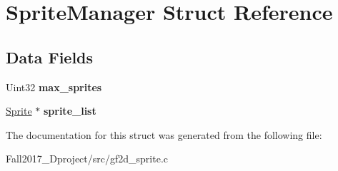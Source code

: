 \hypertarget{struct_sprite_manager}{}\section{Sprite\+Manager Struct Reference}
\label{struct_sprite_manager}
\subsection*{Data Fields}
\begin{DoxyCompactItemize}
\item 
\mbox{\label{struct_sprite_manager_a5ea83f217d51ae6c72599a9e46e1d947}} 
Uint32 {\bfseries max\+\_\+sprites}
\item 
\mbox{\label{struct_sprite_manager_a73dfacf51622ca4310f07375e16591e1}} 
\hyperlink{struct_sprite___s}{Sprite} $\ast$ {\bfseries sprite\+\_\+list}
\end{DoxyCompactItemize}


The documentation for this struct was generated from the following file\+:\begin{DoxyCompactItemize}
\item 
Fall2017\+\_\+Dproject/src/gf2d\+\_\+sprite.\+c\end{DoxyCompactItemize}
